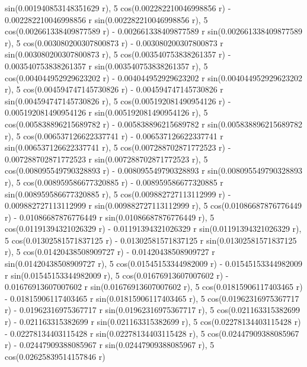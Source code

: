 \documentclass[a4paper,10pt]{article}
\begin{document}
\begin{eulernotebook}
\begin{eulercomment}
\begin{eulercomment}
\begin{eulercomment}
\begin{eulercomment}
\begin{eulercomment}
\begin{eulercomment}
\begin{eulercomment}
\begin{eulercomment}
\begin{eulercomment}
\begin{eulercomment}
\begin{eulercomment}
\begin{eulercomment}
\begin{eulercomment}
\begin{eulercomment}
\begin{eulercomment}
\begin{eulercomment}
\begin{eulercomment}
\begin{eulercomment}
\begin{eulercomment}
\begin{eulercomment}
\begin{eulercomment}
\begin{eulercomment}
\begin{eulercomment}
\begin{eulercomment}
\begin{eulercomment}
\begin{eulercomment}
\begin{eulercomment}
\begin{eulercomment}
\begin{euleroutput}
   sin(0.001940853148351629 r), 5 cos(0.002282210046998856 r)
   - 0.002282210046998856 r sin(0.002282210046998856 r), 
  5 cos(0.002661338409877589 r) - 0.002661338409877589 r
   sin(0.002661338409877589 r), 5 cos(0.003080200307800873 r)
   - 0.003080200307800873 r sin(0.003080200307800873 r), 
  5 cos(0.003540753838261357 r) - 0.003540753838261357 r
   sin(0.003540753838261357 r), 5 cos(0.004044952929623202 r)
   - 0.004044952929623202 r sin(0.004044952929623202 r), 
  5 cos(0.004594747145730826 r) - 0.004594747145730826 r
   sin(0.004594747145730826 r), 5 cos(0.005192081490954126 r)
   - 0.005192081490954126 r sin(0.005192081490954126 r), 
  5 cos(0.005838896215689782 r) - 0.005838896215689782 r
   sin(0.005838896215689782 r), 5 cos(0.006537126622337741 r)
   - 0.006537126622337741 r sin(0.006537126622337741 r), 
  5 cos(0.007288702871772523 r) - 0.007288702871772523 r
   sin(0.007288702871772523 r), 5 cos(0.008095549790328893 r)
   - 0.008095549790328893 r sin(0.008095549790328893 r), 
  5 cos(0.008959586677320885 r) - 0.008959586677320885 r
   sin(0.008959586677320885 r), 5 cos(0.009882727113112999 r)
   - 0.009882727113112999 r sin(0.009882727113112999 r), 
  5 cos(0.01086687876776449 r) - 0.01086687876776449 r
   sin(0.01086687876776449 r), 5 cos(0.01191394321026329 r)
   - 0.01191394321026329 r sin(0.01191394321026329 r), 
  5 cos(0.01302581571837125 r) - 0.01302581571837125 r
   sin(0.01302581571837125 r), 5 cos(0.01420438508909727 r)
   - 0.01420438508909727 r sin(0.01420438508909727 r), 
  5 cos(0.01545153344982009 r) - 0.01545153344982009 r
   sin(0.01545153344982009 r), 5 cos(0.01676913607007602 r)
   - 0.01676913607007602 r sin(0.01676913607007602 r), 
  5 cos(0.01815906117403465 r) - 0.01815906117403465 r
   sin(0.01815906117403465 r), 5 cos(0.01962316975367717 r)
   - 0.01962316975367717 r sin(0.01962316975367717 r), 
  5 cos(0.021163315382699 r) - 0.021163315382699 r
   sin(0.021163315382699 r), 5 cos(0.02278134403115428 r)
   - 0.02278134403115428 r sin(0.02278134403115428 r), 
  5 cos(0.02447909388085967 r) - 0.02447909388085967 r
   sin(0.02447909388085967 r), 5 cos(0.02625839514157846 r)

\end{euleroutput}
\end{eulercomment}
\end{eulercomment}
\end{eulercomment}
\end{eulercomment}
\end{eulercomment}
\end{eulercomment}
\end{eulercomment}
\end{eulercomment}
\end{eulercomment}
\end{eulercomment}
\end{eulercomment}
\end{eulercomment}
\end{eulercomment}
\end{eulercomment}
\end{eulercomment}
\end{eulercomment}
\end{eulercomment}
\end{eulercomment}
\end{eulercomment}
\end{eulercomment}
\end{eulercomment}
\end{eulercomment}
\end{eulercomment}
\end{eulercomment}
\end{eulercomment}
\end{eulercomment}
\end{eulercomment}
\end{eulercomment}
\end{eulernotebook}
\end{document}
